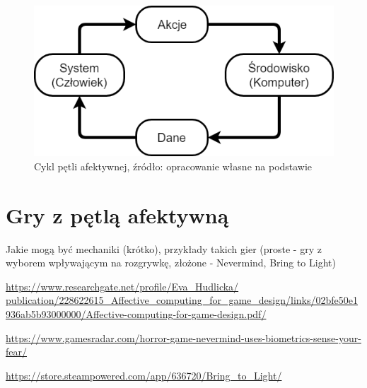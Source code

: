 \begin{figure}
	\centering
	\includegraphics[width=0.6\linewidth]{images/affective_loop.png}
	\caption{Cykl pętli afektywnej, źródło: opracowanie własne na podstawie~\cite{affective_loop_experiences}}
	\label{fig:affective_loop}
\end{figure}


\section{Gry z pętlą afektywną}
Jakie mogą być mechaniki (krótko), przykłady takich gier (proste - gry z wyborem wpływającym na rozgrywkę, złożone - Nevermind, Bring to Light)

\url{https://www.researchgate.net/profile/Eva_Hudlicka/ publication/228622615_Affective_computing_for_game_design/links/02bfe50e1936ab5b93000000/Affective-computing-for-game-design.pdf/}

\url{https://www.gamesradar.com/horror-game-nevermind-uses-biometrics-sense-your-fear/}

\url{https://store.steampowered.com/app/636720/Bring_to_Light/}


